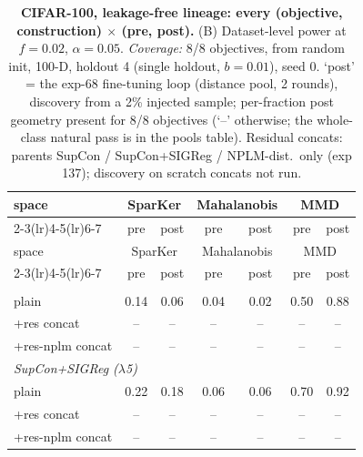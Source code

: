 \begin{center}
\small
\begin{longtable}{lcccccc}
\caption{\textbf{CIFAR-100, leakage-free lineage: every (objective, construction) $\times$ (pre, post).} (B) Dataset-level power at $f=0.02$, $\alpha=0.05$. \emph{Coverage:} 8/8 objectives, from random init, 100-D, holdout 4 (single holdout, $b=0.01$), seed 0. `post' = the exp-68 fine-tuning loop (distance pool, 2 rounds), discovery from a 2\% injected sample; per-fraction post geometry present for 8/8 objectives (`--' otherwise; the whole-class natural pass is in the pools table). Residual concats: parents SupCon / SupCon+SIGReg / NPLM-dist.\ only (exp 137); discovery on scratch concats not run.}\label{tab:grid_cifar100_scratch_b}\\
\toprule
space & \multicolumn{2}{c}{SparKer} & \multicolumn{2}{c}{Mahalanobis} & \multicolumn{2}{c}{MMD} \\
\cmidrule(lr){2-3}\cmidrule(lr){4-5}\cmidrule(lr){6-7}
& pre & post & pre & post & pre & post \\
\midrule
\endfirsthead
\toprule
space & \multicolumn{2}{c}{SparKer} & \multicolumn{2}{c}{Mahalanobis} & \multicolumn{2}{c}{MMD} \\
\cmidrule(lr){2-3}\cmidrule(lr){4-5}\cmidrule(lr){6-7}
& pre & post & pre & post & pre & post \\
\midrule
\endhead
\bottomrule
\endfoot
\multicolumn{7}{l}{\emph{SupCon}} \\
\quad plain & 0.14 & 0.06 & 0.04 & 0.02 & 0.50 & 0.88 \\
\quad +res concat & -- & -- & -- & -- & -- & -- \\
\quad +res-nplm concat & -- & -- & -- & -- & -- & -- \\
\multicolumn{7}{l}{\emph{SupCon+SIGReg ($\lambda$5)}} \\
\quad plain & 0.22 & 0.18 & 0.06 & 0.06 & 0.70 & 0.92 \\
\quad +res concat & -- & -- & -- & -- & -- & -- \\
\quad +res-nplm concat & -- & -- & -- & -- & -- & -- \\

\end{longtable}
\end{center}
